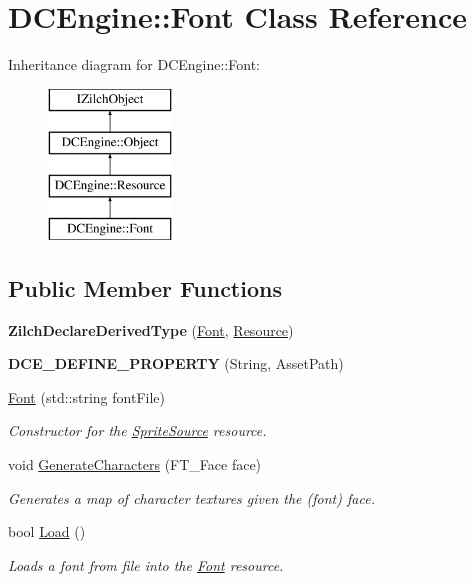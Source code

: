 \hypertarget{classDCEngine_1_1Font}{\section{D\-C\-Engine\-:\-:Font Class Reference}
\label{classDCEngine_1_1Font}
}
Inheritance diagram for D\-C\-Engine\-:\-:Font\-:\begin{figure}[H]
\begin{center}
\leavevmode
\includegraphics[height=4.000000cm]{classDCEngine_1_1Font}
\end{center}
\end{figure}
\subsection*{Public Member Functions}
\begin{DoxyCompactItemize}
\item 
\hypertarget{classDCEngine_1_1Font_a808e5898a864bf8dde296b72a7dd55cb}{{\bfseries Zilch\-Declare\-Derived\-Type} (\hyperlink{classDCEngine_1_1Font}{Font}, \hyperlink{classDCEngine_1_1Resource}{Resource})}\label{classDCEngine_1_1Font_a808e5898a864bf8dde296b72a7dd55cb}

\item 
\hypertarget{classDCEngine_1_1Font_ae67be56ee6372d34c46c5d07f103cce8}{{\bfseries D\-C\-E\-\_\-\-D\-E\-F\-I\-N\-E\-\_\-\-P\-R\-O\-P\-E\-R\-T\-Y} (String, Asset\-Path)}\label{classDCEngine_1_1Font_ae67be56ee6372d34c46c5d07f103cce8}

\item 
\hyperlink{classDCEngine_1_1Font_a7626d069cfcc066d35a3d123b83b403f}{Font} (std\-::string font\-File)
\begin{DoxyCompactList}\small\item\em Constructor for the \hyperlink{classDCEngine_1_1SpriteSource}{Sprite\-Source} resource. \end{DoxyCompactList}\item 
void \hyperlink{classDCEngine_1_1Font_a5c50f31b7bfbcc1ecf568882a6b1719c}{Generate\-Characters} (F\-T\-\_\-\-Face face)
\begin{DoxyCompactList}\small\item\em Generates a map of character textures given the (font) face. \end{DoxyCompactList}\item 
bool \hyperlink{classDCEngine_1_1Font_ae677105844515ccb2857abf68dc13af6}{Load} ()
\begin{DoxyCompactList}\small\item\em Loads a font from file into the \hyperlink{classDCEngine_1_1Font}{Font} resource. \end{DoxyCompactList}\end{DoxyCompactItemize}
